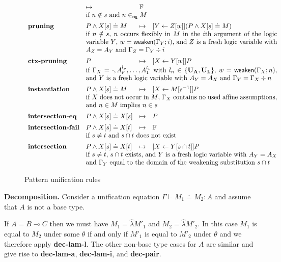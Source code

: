 \documentclass{eptcs}
\newcommand\fUA{{\textup{\textbf{U}}_\textup{\textbf{A}}}}
\newcommand\fUL{{\textup{\textbf{U}}_\textup{\textbf{L}}}}
\theoremstyle{definition}
\begin{document}
\begin{figure}
\[{\begin{array}{llll}
&\mapsto& \mathbb{F} \\
&\multicolumn{3}{p{\width}}{
if $n\notin s$ and $n\in_{\textsf{rig}} M$
} \\
\spacer\textbf{pruning} &
P\land X[s] \doteq M
&\mapsto& [Y\leftarrow Z[w]](P\land X[s]\doteq M) \\
&\multicolumn{3}{p{\width}}{
if $n\notin s$, $n$ occurs flexibly in $M$ in the $i$th argument of
the logic variable $Y$, $w=\textsf{weaken}(\Gamma_Y;i)$,
and $Z$ is a fresh logic variable with
$A_Z=A_Y$ and $\Gamma_Z=\Gamma_Y\div i$
} \\
\spacer\textbf{ctx-pruning} &
P
&\mapsto& [X\leftarrow Y[w]]P \\
&\multicolumn{3}{p{\width}}{
if $\Gamma_X=\cdot,A_p^{l_p},\ldots,A_1^{l_1}$ with
$l_n\in\{\fUA,\fUL\}$,
$w=\textsf{weaken}(\Gamma_X;n)$, and $Y$ is a fresh logic
variable with $A_Y=A_X$ and
$\Gamma_Y=\Gamma_X\div n$
} \\
\spacer\textbf{instantiation} &
P\land X[s] \doteq M
&\mapsto& [X\leftarrow M[s^{-1}]]P \\
&\multicolumn{3}{p{\width}}{
if $X$ does not occur in $M$,
$\Gamma_X$ contains no used affine assumptions,
and $n\in M$ implies $n\in s$
} \\
\spacer\textbf{intersection-eq} &
P\land X[s] \doteq X[s]
&\mapsto& P \\
\spacer\textbf{intersection-fail} &
P\land X[s] \doteq X[t]
&\mapsto& \mathbb{F} \\
&\multicolumn{3}{p{\width}}{
if $s\neq t$ and $s\cap t$ does not exist
} \\
\spacer\textbf{intersection} &
P\land X[s] \doteq X[t]
&\mapsto& [X\leftarrow Y[s\cap t]]P \\
&\multicolumn{3}{p{\width}}{
if $s\neq t$, $s\cap t$ exists, and $Y$ is a fresh logic variable with
$A_Y=A_X$ and $\Gamma_Y$ equal to the domain of the weakening
substitution $s\cap t$
} \\
\end{array}
}
\]
\caption{Pattern unification rules\label{fig:pat-unif}}
\end{figure} 


\medskip \noindent\textbf{Decomposition.}
Consider a unification equation $\Gamma\vdash M_1\doteq M_2 :A$ and
assume that $A$ is not a base type.

If $A=B\multimap C$ then we
must have $M_1=\widehat{\lambda}M'_1$ and $M_2=\widehat{\lambda}M'_2$.
In this case $M_1$ is equal to $M_2$ under some $\theta$
if and only if $M'_1$ is equal to $M'_2$ under $\theta$ and we therefore
apply \textbf{dec-lam-l}.  The other non-base type cases for $A$ are
similar and give rise to \textbf{dec-lam-a}, \textbf{dec-lam-i}, and
\textbf{dec-pair}.
\end{document}
